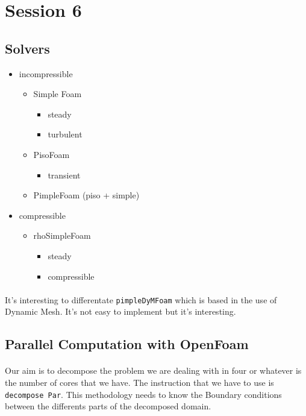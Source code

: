 \lstset{language=C}
\section{Session 6}
\subsection{Solvers}
\begin{itemize}
\item{} incompressible
	\begin{itemize}
	\item{} Simple Foam
	\begin{itemize}
		\item{} steady
		\item{} turbulent
	\end{itemize}
	\item{} PisoFoam
	\begin{itemize}
		\item{} transient
	\end{itemize}
	\item{} PimpleFoam (piso + simple)
	\end{itemize}	
\item{} compressible
\begin{itemize}
	\item{} rhoSimpleFoam
	\begin{itemize}
		\item{} steady
		\item{} compressible
	\end{itemize}
\end{itemize}
\end{itemize}
\paragraph{}It's interesting to differentate \texttt{pimpleDyMFoam} which is based in the use of Dynamic Mesh. It's not easy to implement but it's interesting.

\subsection{Parallel Computation with OpenFoam}
\paragraph{}Our aim is to decompose the problem we are dealing with in four or whatever is the number of cores that we have. The instruction that we have to use is \texttt{decompose Par}. This methodology needs to know the Boundary conditions between the differents parts of the decomposed domain. 

